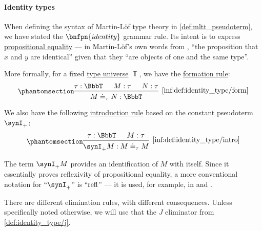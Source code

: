\paragraph{Identity types}

\begin{definition}\label{def:identity_type}
  When defining the syntax of Martin-L\"of type theory in \cref{def:mltt_pseudoterm}, we have stated the \( \bnfpn{identity} \) grammar rule. Its intent is to express \hyperref[con:equality]{propositional equality} --- in Martin-L\"of's own words from \cite[81]{MartinLöf1975IntuitionisticTypeTheory}, \enquote{the proposition that \( x \) and \( y \) are identical} given that they \enquote{are objects of one and the same type}.

  More formally, for a fixed \hyperref[con:type_universe]{type universe} \( \BbbT \), we have the \hyperref[rem:type_theory_rule_classification/form]{formation rule}:
  \begin{equation*}\taglabel[\ensuremath{ =_{\logic{form}} }]{inf:def:identity_type/form}
    \begin{prooftree}
      \hypo{ \tau: \BbbT }
      \hypo{ M: \tau }
      \hypo{ N: \tau }
      \infer3[\ref{inf:def:identity_type/form}]{ M \syneq_{\tau} N: \BbbT }
    \end{prooftree}
  \end{equation*}

  We also have the following \hyperref[rem:type_theory_rule_classification/intro]{introduction rule} based on the constant pseudoterm \( \synI_+ \):
  \begin{equation*}\taglabel[\ensuremath{ =_+ }]{inf:def:identity_type/intro}
    \begin{prooftree}
      \hypo{ \tau: \BbbT }
      \hypo{ M: \tau }
      \infer2[\ref{inf:def:identity_type/intro}]{ \synI_+ M: M \syneq_\tau M }
    \end{prooftree}
  \end{equation*}

  The term \( \synI_+ M \) provides an identification of \( M \) with itself. Since it essentially proves reflexivity of propositional equality, a more conventional notation for \enquote{\( \synI_+ \)} is \enquote{\( \op{refl} \)} --- it is used, for example, in \cite[\S A.2.10]{UnivalentFoundationsProgram2024OctoberHoTT} and \cite[\S 9.1.3]{Mimram2020ProgramEqualsProof}.

  There are different elimination rules, with different consequences. Unless specifically noted otherwise, we will use that the \( J \) eliminator from \cref{def:identity_type/j}.


\end{definition}
